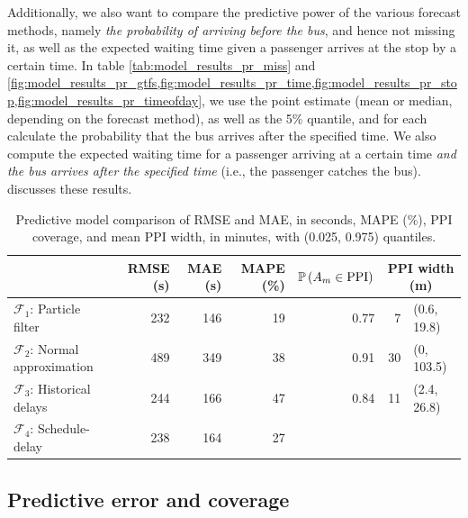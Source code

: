 Additionally, we also want to compare the predictive power of the various forecast methods, namely \emph{the probability of arriving before the bus}, and hence not missing it, as well as the expected waiting time given a passenger arrives at the stop by a certain time. In table \cref{tab:model_results_pr_miss} and \cref{fig:model_results_pr_gtfs,fig:model_results_pr_time,fig:model_results_pr_stop,fig:model_results_pr_timeofday}, we use the point estimate (mean or median, depending on the forecast method), as well as the 5\% quantile, and for each calculate the probability that the bus arrives after the specified time. We also compute the expected waiting time for a passenger arriving at a certain time \emph{and the bus arrives after the specified time} (i.e., the passenger catches the bus).  discusses these results.






\begin{knitrout}\small
{}\color{fgcolor}\begin{table}

\caption{\label{tab:model_results_rmse}Predictive model comparison of RMSE and MAE, in seconds, MAPE (\%), PPI coverage, and mean PPI width, in minutes, with (0.025, 0.975) quantiles.}
\centering
\fontsize{8}{10}\selectfont
\begin{tabular}[t]{lrrrrrl}
\toprule
  & RMSE (s) & MAE (s) & MAPE (\%) & $\mathbb{P}\left(A_m \in \text{PPI}\right)$ & \multicolumn{2}{c}{PPI width (m)} \\
\midrule
$\mathcal{F}_1$: Particle filter & 232 & 146 & 19 & 0.77 & 7 & (0.6, 19.8)\\
$\mathcal{F}_2$: Normal approximation & 489 & 349 & 38 & 0.91 & 30 & (0, 103.5)\\
$\mathcal{F}_3$: Historical delays & 244 & 166 & 47 & 0.84 & 11 & (2.4, 26.8)\\
$\mathcal{F}_4$: Schedule-delay & 238 & 164 & 27 &  &  & \\
\bottomrule
\end{tabular}
\end{table}


\end{knitrout}




\subsection{Predictive error and coverage}
\label{sec:prediction_model_comp_stats}

